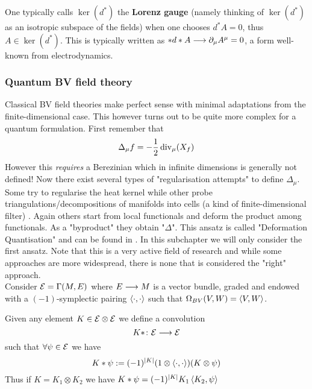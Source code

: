 \begin{notation}
  One typically calls $\ker(d^*)$ the \textbf{Lorenz gauge} (namely thinking of $\ker(d^*)$ as an isotropic subspace of the fields) when one chooses $d^*A = 0$, thus $A \in \ker(d^*)$. This is typically written as $*d* A \longrightarrow \partial_\mu A^\mu = 0$, a form well-known from electrodynamics.
\end{notation}


\subsubsection{Quantum BV field theory}

Classical BV field theories make perfect sense with minimal adaptations from the finite-dimensional case. This however turns out to be quite more complex for a quantum formulation. First remember that
\begin{equation}
  \Delta_\mu f = - \frac{1}{2} \operatorname{div}_\mu(X_f)
\end{equation}
However this \emph{requires} a Berezinian which in infinite dimensions is generally not defined! Now there exist several types of "regularisation attempts" to define $\Delta_\mu$. Some try to regularise the heat kernel \cite{Costello} while other probe triangulations/decompositions of manifolds into cells (a kind of finite-dimensional filter) \cite{Mnev, ...}. Again others start from local functionals and deform the product among functionals. As a "byproduct" they obtain "$\Delta$". This ansatz is called "Deformation Quantisation" and can be found in \cite{PAQFT}. In this subchapter we will only consider the first ansatz. Note that this is a very active field of research and while some approaches are more widespread, there is none that is considered the "right" approach.\\

Consider ${\mathcal{E}} = \Gamma(M, E)$ where $E \longrightarrow M$ is a vector bundle, graded and endowed with a $(-1)$-symplectic pairing $\left\langle \cdot , \cdot \right\rangle$ such that $\Omega_{BV}(V,W) = \left\langle V , W \right\rangle$.

\begin{definition}
  Given any element $K \in {\mathcal{E}} \otimes {\mathcal{E}}$ we define a convolution
  \begin{equation}
    K* \colon {\mathcal{E}} \longrightarrow {\mathcal{E}}
  \end{equation}
  such that $\forall \psi \in {\mathcal{E}} $ we have
  \begin{equation}
    K * \psi := (-1)^{|K|} ( 1 \otimes \left\langle \cdot , \cdot \right\rangle)(K \otimes \psi)
  \end{equation}
  Thus if $K = K_1 \otimes K_2$ we have $K * \psi = (-1)^{|K|} K_1 \left\langle K_2 , \psi \right\rangle$
\end{definition}

